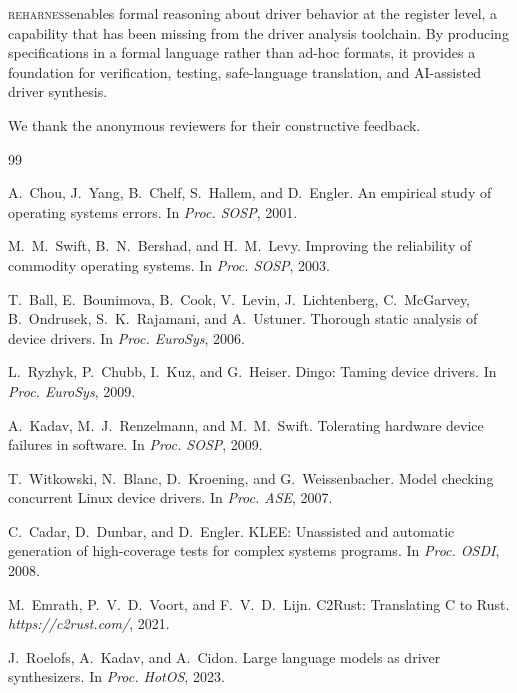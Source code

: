 \documentclass[sigconf,review]{acmart}
\newcommand{\reharness}{\textsc{reharness}}
\begin{document}
\reharness enables formal reasoning about driver behavior at the register level, a capability that has been missing from the driver analysis toolchain. By producing specifications in a formal language rather than ad-hoc formats, it provides a foundation for verification, testing, safe-language translation, and AI-assisted driver synthesis.

\begin{acks}
We thank the anonymous reviewers for their constructive feedback.
\end{acks}


\begin{thebibliography}{99}

A.~Chou, J.~Yang, B.~Chelf, S.~Hallem, and D.~Engler.
\newblock An empirical study of operating systems errors.
\newblock In \emph{Proc. SOSP}, 2001.

M.~M.~Swift, B.~N.~Bershad, and H.~M.~Levy.
\newblock Improving the reliability of commodity operating systems.
\newblock In \emph{Proc. SOSP}, 2003.

T.~Ball, E.~Bounimova, B.~Cook, V.~Levin, J.~Lichtenberg, C.~McGarvey, B.~Ondrusek, S.~K.~Rajamani, and A.~Ustuner.
\newblock Thorough static analysis of device drivers.
\newblock In \emph{Proc. EuroSys}, 2006.

L.~Ryzhyk, P.~Chubb, I.~Kuz, and G.~Heiser.
\newblock Dingo: Taming device drivers.
\newblock In \emph{Proc. EuroSys}, 2009.

A.~Kadav, M.~J.~Renzelmann, and M.~M.~Swift.
\newblock Tolerating hardware device failures in software.
\newblock In \emph{Proc. SOSP}, 2009.

T.~Witkowski, N.~Blanc, D.~Kroening, and G.~Weissenbacher.
\newblock Model checking concurrent Linux device drivers.
\newblock In \emph{Proc. ASE}, 2007.

C.~Cadar, D.~Dunbar, and D.~Engler.
\newblock KLEE: Unassisted and automatic generation of high-coverage tests for complex systems programs.
\newblock In \emph{Proc. OSDI}, 2008.

M.~Emrath, P.~V.~D.~Voort, and F.~V.~D.~Lijn.
\newblock C2Rust: Translating C to Rust.
\newblock \emph{https://c2rust.com/}, 2021.

J.~Roelofs, A.~Kadav, and A.~Cidon.
\newblock Large language models as driver synthesizers.
\newblock In \emph{Proc. HotOS}, 2023.


\end{thebibliography}
\end{document}
